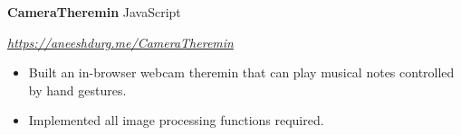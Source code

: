 \documentclass[paper=a4,fontsize=10pt]{scrartcl} %
\newcommand{\EducationEntry}[4]{
		\noindent \textbf{#1}     %
			\hfill#2 \par  %
		\noindent \textit{#3} \par        %
		\noindent\hangafter=0 \small #4 %
		\normalsize \par}
\begin{document}
\begin{minipage}[t]{0.75\textwidth}

\EducationEntry{CameraTheremin}{JavaScript}{\url{https://aneeshdurg.me/CameraTheremin}}{
\begin{itemize}
  \item Built an in-browser webcam theremin that can play musical notes controlled by hand gestures.
  \item Implemented all image processing functions required.
\end{itemize}
}

\end{minipage}
\end{document}
